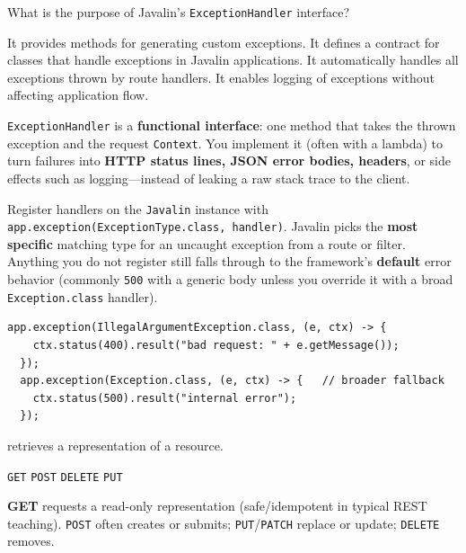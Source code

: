 \question[4]
What is the purpose of Javalin's \texttt{ExceptionHandler} interface?
\begin{choices}
  \choice It provides methods for generating custom exceptions.
  \CorrectChoice It defines a contract for classes that handle exceptions in Javalin applications.
  \choice It automatically handles all exceptions thrown by route handlers.
  \choice It enables logging of exceptions without affecting application flow.
\end{choices}
\begin{solution}
  \texttt{ExceptionHandler} is a \textbf{functional interface}: one method that takes the thrown exception and the request \texttt{Context}. You implement it (often with a lambda) to turn failures into \textbf{HTTP status lines, JSON error bodies, headers}, or side effects such as logging---instead of leaking a raw stack trace to the client.

  Register handlers on the \texttt{Javalin} instance with \texttt{app.exception(ExceptionType.class, handler)}. Javalin picks the \textbf{most specific} matching type for an uncaught exception from a route or filter. Anything you do not register still falls through to the framework's \textbf{default} error behavior (commonly \texttt{500} with a generic body unless you override it with a broad \texttt{Exception.class} handler).

  \begin{lstlisting}[style=javaexam]
  app.exception(IllegalArgumentException.class, (e, ctx) -> {
    ctx.status(400).result("bad request: " + e.getMessage());
  });
  app.exception(Exception.class, (e, ctx) -> {   // broader fallback
    ctx.status(500).result("internal error");
  });
  \end{lstlisting}
\end{solution}

\newpage


\question[4]
\blank[3.5em] retrieves a representation of a resource.
\begin{choices}
  \CorrectChoice \texttt{GET}
  \choice \texttt{POST}
  \choice \texttt{DELETE}
  \choice \texttt{PUT}
\end{choices}
\begin{solution}
  \textbf{GET} requests a read-only representation (safe/idempotent in typical REST teaching). \texttt{POST} often creates or submits; \texttt{PUT}/\texttt{PATCH} replace or update; \texttt{DELETE} removes.
\end{solution}

